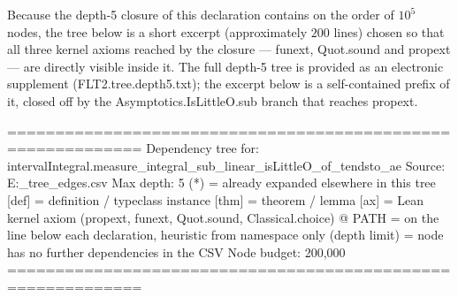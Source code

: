 \documentclass[11pt,reqno]{amsart}
\begin{document}
\noindent \noindent Because the depth-5 closure of this declaration contains
on the order of $10^{5}$ nodes, the tree below is a short excerpt
(approximately $200$ lines) chosen so that all three kernel axioms reached
by the closure --- \textsf{funext}, \textsf{Quot\allowbreak.sound} and 
\textsf{propext} --- are directly visible inside it. The full depth-5 tree
is provided as an electronic supplement (\textsf{FLT2.tree.depth5.txt}); the
excerpt below is a self-contained prefix of it, closed off by the \textsf{%
Asymptotics.IsLittleO.sub} branch that reaches \textsf{propext}.

\text{ \ } \text{ \ } 
\begin{verbatimbox}
============================================================
Dependency tree for: intervalIntegral.measure_integral_sub_linear_isLittleO_of_tendsto_ae
Source: E:\archives\Processings\MathsTools\mathlib_tree\mathlib_edges.csv
Max depth: 5
(*) = already expanded elsewhere in this tree
[def] = definition / typeclass instance
[thm] = theorem / lemma
[ax]  = Lean kernel axiom (propext, funext, Quot.sound, Classical.choice)
@ PATH = on the line below each declaration, heuristic from namespace only
(depth limit) = node has no further dependencies in the CSV
Node budget: 200,000
============================================================


\end{verbatimbox}
\end{document}
